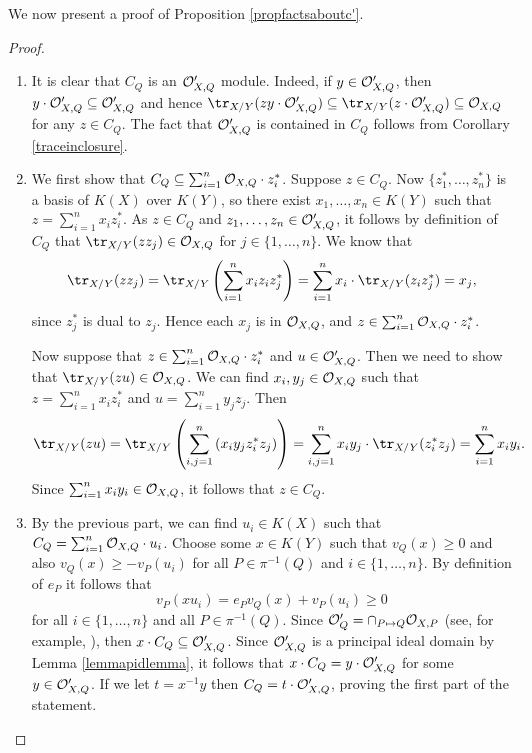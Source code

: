 We now present a proof of Proposition \ref{propfactsaboutc'}.

    \begin{proof}
        \begin{enumerate}
        \item It is clear that $C_Q$ is an ${\cal O}_{X,Q}'$ module.
        Indeed, if $y\in {\cal O}_{X,Q}'$, then $y\cdot {\cal O}_{X,Q}' \subseteq {\cal O}_{X,Q}'$ and hence $\tr_{X/Y}(z y\cdot \cO_{X,Q}')\subseteq \tr_{X/Y}(z\cdot \cO_{X,Q}') \subseteq \cO_{X,Q}$ for any $z\in C_Q$.
        The fact that ${\cal O}_{X,Q}'$ is contained in $C_Q$ follows from Corollary \ref{traceinclosure}.
        \item We first show that $C_Q \subseteq \sum_{i=1}^n {\cal O}_{X,Q}\cdot z_i^*$.
        Suppose $z\in C_Q$.
        Now $\{z_1^*, \ldots ,z_n^*\}$ is a basis of $K(X)$ over $K(Y)$, so there exist $x_1,\ldots , x_n\in K(Y)$ such that $z=\sum_{i=1}^n x_iz_i^*$.
        As $z\in C_Q$ and $z_1,\ldots ,z_n\in {\cal O}_{X,Q}'$, it follows by definition of $C_Q$ that $\tr_{X/Y}(zz_j)\in \cO_{X,Q}$ for $j\in \{1,\ldots ,n\}$.
        We know that 
            \[
            \tr_{X/Y}(zz_j) = \tr_{X/Y}\left(\sum_{i=1}^nx_iz_iz_j^*\right) = \sum_{i=1}^nx_i \cdot \tr_{X/Y}(z_iz_j^*) = x_j,
            \]
        since $z_j^*$ is dual to $z_j$.
        Hence each $x_j$ is in ${\cal O}_{X,Q}$, and $z\in \sum_{i=1}^n{\cal O}_{X,Q}\cdot z_i^*$.
        
        Now suppose that $z\in \sum_{i=1}^n{\cal O}_{X,Q}\cdot z_i^*$ and $u\in {\cal O}_{X,Q}'$.
        Then we need to show that $\tr_{X/Y}(z u)\in \cO_{X,Q}$.
        We can find $x_i, y_j\in {\cal O}_{X,Q}$ such that $z=\sum_{i=1}^n x_iz_i^*$ and $u=\sum_{i=1}^ny_jz_j$.
        Then
            \[
            \tr_{X/Y}(zu) = \tr_{X/Y}\left(\sum_{i,j=1}^n \left(x_iy_jz_i^*z_j\right)\right) = \sum_{i,j=1}^n x_iy_j\cdot \tr_{X/Y}(z_i^*z_j) = \sum_{i=1}^n x_iy_i.
            \]
        Since $\sum_{i=1}^n x_iy_i\in {\cal O}_{X,Q}$, it follows that $z\in C_Q$.
        \item By the previous part, we can find $u_i\in K(X)$ such that $C_Q = \sum_{i=1}^n {\cal O}_{X,Q} \cdot u_i$.
        Choose some $x\in K(Y)$ such that $v_Q(x)\geq 0$ and also $v_Q(x)\geq -v_P(u_i)$ for all $P\in \pi^{-1}(Q)$ and $i\in \{1,\ldots ,n\}$.
        By definition of $e_P$ it follows that
            \[ 
            v_P(xu_i) = e_Pv_Q(x) + v_P(u_i) \geq 0
            \]
        for all $i\in \{1,\ldots, n\}$ and all $P\in \pi^{-1}(Q)$.
        Since ${\cal O}'_Q = \cap_{P\mapsto Q} {\cal O}_{X,P}$ (see, for example, \cite[Cor. 3.3.5]{stichtenoth}), then $x\cdot C_Q \subseteq {\cal O}_{X,Q}'$.
        Since ${\cal O}_{X,Q}'$ is a principal ideal domain by Lemma \ref{lemmapidlemma}, it follows that $x\cdot C_Q = y\cdot {\cal O}_{X,Q}'$ for some $y\in {\cal O}_{X,Q}'$.
        If we let $t=x^{-1}y$ then $C_Q =t\cdot {\cal O}_{X,Q}'$, proving the first part of the statement.
        

\end{enumerate}
\end{proof}
